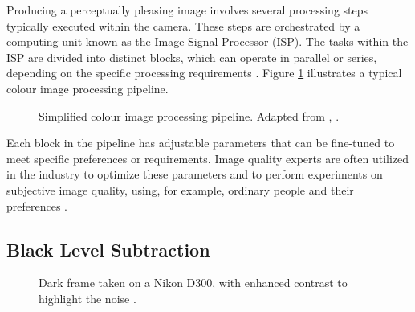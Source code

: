Producing a perceptually pleasing image involves several processing steps typically executed within the camera. These steps are orchestrated by a computing unit known as the Image Signal Processor (ISP). The tasks within the ISP are divided into distinct blocks, which can operate in parallel or series, depending on the specific processing requirements \cite[91-101]{phillips2018camera}. Figure \ref{fig:dip} illustrates a typical colour image processing pipeline.

\begin{figure}
\centering

\caption{Simplified colour image processing pipeline. Adapted from \cite{Ramanath}, \cite{JianpingZhou2007IPTf}.}
\label{fig:dip}
\end{figure}

Each block in the pipeline has adjustable parameters that can be fine-tuned to meet specific preferences or requirements. Image quality experts are often utilized in the industry to optimize these parameters and to perform experiments on subjective image quality, using, for example, ordinary people and their preferences \cite[29]{phillips2018camera}.


\subsection{Black Level Subtraction}

\begin{figure}
    \centering
    \caption{Dark frame taken on a Nikon D300, with enhanced contrast to highlight the noise \cite{darkframe}.}
    \label{fig:darkframe}
\end{figure}

